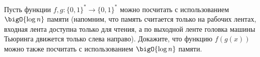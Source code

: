 Пусть функции $f, g\colon \{0, 1\}^* \rightarrow \{0, 1\}^*$ можно посчитать с использованием
$\bigO{\log n}$ памяти (напомним, что память считается только на рабочих лентах, входная лента доступна
только для чтения, а по выходной ленте головка машины Тьюринга движется только слева направо). Докажите,
что функцию $f(g(x))$ можно также посчитать с использованием $\bigO{\log n}$ памяти.